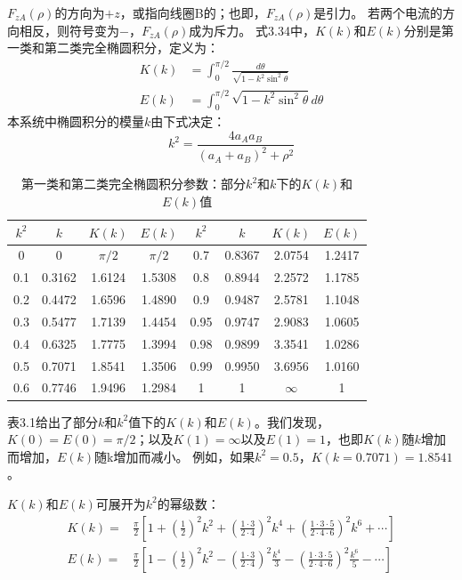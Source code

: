 $F_{zA}(\rho)$的方向为$+z$，或指向线圈B的；也即，$F_{zA}(\rho)$是引力。
若两个电流的方向相反，则符号变为$-$，$F_{zA}(\rho)$成为斥力。
式3.34中，$K(k)$和$E(k)$分别是第一类和第二类完全椭圆积分，定义为：
\begin{subequations}
	\begin{align}
  K(k) &= \int_{0}^{\pi/2} \frac{d\theta}{\sqrt{1-k^2\sin^2\theta}} \\
  E(k)&= \int_{0}^{\pi/2}\sqrt{1-k^2 \sin^2\theta}d\theta
  \end{align}
\end{subequations}
本系统中椭圆积分的模量$k$由下式决定：
\begin{equation}
  k^2=\frac{4a_A a_B}{(a_A+a_B)^2+\rho^2}
\end{equation}

\begin{table}[htbp]\small
\centering
\caption{第一类和第二类完全椭圆积分参数：部分$k^2$和$k$下的$K(k)$和$E(k)$值}
\label{my-label}
\begin{tabular}{|c|c||c|c||c|c||c|c|}
\hline
$k^2$    & $k$  & $K(k)$ &$E(k)$  &$k^2$  & $k$ &$K(k)$  &$E(k)$  \\ \hline\hline
0   & 0 &$\pi/2$  & $\pi/2$ &0.7&0.8367  &2.0754  & 1.2417 \\ 
0.1 & 0.3162  & 1.6124 &1.5308  &0.8& 0.8944 & 2.2572 & 1.1785 \\ 
0.2 & 0.4472  & 1.6596 &1.4890  &0.9&0.9487  & 2.5781 & 1.1048 \\ 
0.3 & 0.5477  & 1.7139 & 1.4454 &0.95&0.9747  &2.9083  & 1.0605 \\
0.4 & 0.6325  & 1.7775 &1.3994  &0.98& 0.9899 & 3.3541 & 1.0286 \\ 
0.5 & 0.7071  & 1.8541 &1.3506  & 0.99& 0.9950 &3.6956  & 1.0160 \\ 
0.6 & 0.7746  & 1.9496 &1.2984  &1  &1  &$\infty$  &  1\\ \hline
\end{tabular}
\end{table}

表3.1给出了部分$k$和$k^2$值下的$K(k)$和$E(k)$。我们发现，$K(0)=E(0)=\pi/2$；以及$K(1)=\infty$以及$E(1)=1$，也即$K(k)$随$k$增加而增加，$E(k)$随k增加而减小。
例如，如果$k^2=0.5$，$K(k=0.7071)=1.8541$。

$K(k)$和$E(k)$可展开为$k^2$的幂级数：
\begin{subequations}
	\begin{align}
  K(k) =& \frac{\pi}{2}\left[1+\left(\frac{1}{2}\right)^2 k^2+\left(\frac{1\cdot 3}{2\cdot 4}\right)^2 k^4+\left(\frac{1\cdot 3\cdot 5}{2\cdot 4\cdot 6}\right)^2 k^6+\cdots\right] \\
  E(k) =& \frac{\pi}{2}\left[1-\left(\frac{1}{2}\right)^2 k^2-\left(\frac{1\cdot 3}{2\cdot 4}\right)^2 \frac{k^4}{3}-\left(\frac{1\cdot 3\cdot 5}{2\cdot 4\cdot 6}\right)^2 \frac{k^6}{5}-\cdots\right]
 	\end{align}
  \end{subequations}

